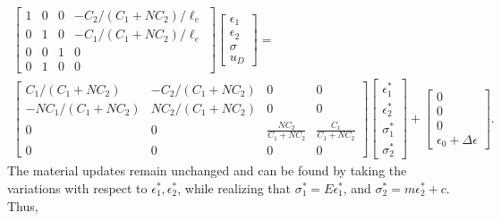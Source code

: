 \documentclass[10pt,review]{cas-sc}
\begin{document}
\begin{multline}
	\begin{bmatrix}
		1 & 0& 0&  -C_2/(C_1+NC_2)/ \ell_e \\
		0 & 1 & 0 & -C_1/(C_1+NC_2)/ \ell_e \\
		0 & 0 & 1 & 0 \\
		0 & 1 & 0 & 0
	\end{bmatrix}
	\begin{bmatrix}
		\epsilon_1 \\
		\epsilon_2 \\
		\sigma \\
		u_D
	\end{bmatrix}
	= \\
	\begin{bmatrix}
		C_1/(C_1+NC_2) & -C_2/(C_1+NC_2) & 0 & 0 \\
		-NC_1/(C_1+NC_2) & NC_2/(C_1+NC_2) & 0 & 0 \\
		0 & 0 & \frac{NC_2}{C_1+N C_2} & \frac{C_1}{C_1+N C_2} \\ 
		0 & 0 & 0&0
	\end{bmatrix}
	\begin{bmatrix}
		\epsilon_1^* \\
		\epsilon_2^* \\
		\sigma_1^* \\
		\sigma_2^* 
	\end{bmatrix}
	+
	\begin{bmatrix}
		0 \\
		0  \\
		0	\\
		\epsilon_0 + \Delta \epsilon
	\end{bmatrix}
	.\label{big_update_mech_al}
\end{multline}
The material updates remain unchanged and can be found by taking the variations with respect to $\epsilon_1^*, \epsilon_2^*$, while realizing that $\sigma_1^*=E\epsilon_1^*$, and $\sigma_2^*=m\epsilon_2^*+c$. Thus,
\end{document}
